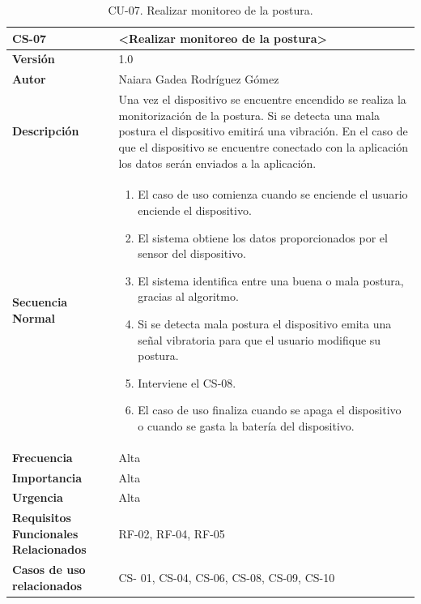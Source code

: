 \begin{table}[h!]
\centering
\begin{tabular}{ |m{3cm}|m{11cm}|  } 
\hline
\cellcolor[HTML]{B9E3F0}\textbf{CS-07} & \cellcolor[HTML]{B9E3F0}\textbf{<Realizar monitoreo de la postura>}\\

\hline
\cellcolor[HTML]{EFEFEF}\textbf{Versión}             & 1.0  \\
\hline
\cellcolor[HTML]{EFEFEF}\textbf{Autor}                & Naiara Gadea Rodríguez Gómez\\
\hline
\cellcolor[HTML]{EFEFEF}\textbf{Descripción}                & {Una vez el dispositivo se encuentre encendido se realiza la monitorización de la postura. Si se detecta una mala postura el dispositivo emitirá una vibración. En el caso de que el dispositivo se encuentre conectado con la aplicación los datos serán enviados a la aplicación.}\\
\hline
\cellcolor[HTML]{EFEFEF}\textbf{Secuencia \newline Normal}                &                 
        \begin{enumerate}
			\def\labelenumi{\arabic{enumi}.}
			\tightlist
			\item El caso de uso comienza cuando se enciende el usuario enciende el dispositivo. 
			\item El sistema obtiene los datos proporcionados por el sensor del dispositivo. 
                \item El sistema identifica entre una buena o mala postura, gracias al algoritmo. 
                \item Si se detecta mala postura el dispositivo emita una señal vibratoria para que el usuario modifique su postura.
                \item Interviene el CS-08. 
                \item El caso de uso finaliza cuando se apaga el dispositivo o cuando se gasta la batería del dispositivo.
		\end{enumerate}\\
\hline
\cellcolor[HTML]{EFEFEF}\textbf{Frecuencia}                & Alta\\
\hline
\cellcolor[HTML]{EFEFEF}\textbf{Importancia}                & Alta\\
\hline
\cellcolor[HTML]{EFEFEF}\textbf{Urgencia}                & Alta\\
\hline
\cellcolor[HTML]{EFEFEF}\textbf{Requisitos Funcionales Relacionados}                & {RF-02, RF-04, RF-05 }\\
\hline
\cellcolor[HTML]{EFEFEF}\textbf{Casos de uso relacionados}                & {CS- 01, CS-04, CS-06, CS-08, CS-09, CS-10 }\\
\hline
\end{tabular}
\caption{CU-07. Realizar monitoreo de la postura.}
\end{table}

